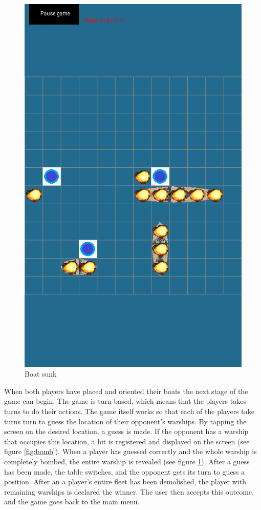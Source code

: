 \begin{figure}[ht]
\begin{minipage}[b]{0.325\linewidth}
		\includegraphics[scale=0.225]{img/Screenshot_sunk.png}
		\caption{Boat sunk}
		\label{fig:sunk}
	\end{minipage}

\end{figure}
When both players have placed and oriented their boats the next stage of the game can begin.
The game is turn-based, which means that the players takes turns to do their actions.
The game itself works so that each of the players take turns turn to guess the location of their opponent's warships. By tapping the screen on the desired location, a guess is made. If the opponent has a warship that occupies this location, a hit is registered and displayed on the screen (see figure \ref{fig:bomb}). When a player has guessed correctly and the whole warship is completely bombed, the entire warship is revealed (see figure \ref{fig:sunk}). After a guess has been made, the table switches, and the opponent gets its turn to guess a position. After an a player's entire fleet has been demolished, the player with remaining warships is declared the winner. The user then accepts this outcome, and the game goes back to the main menu.

